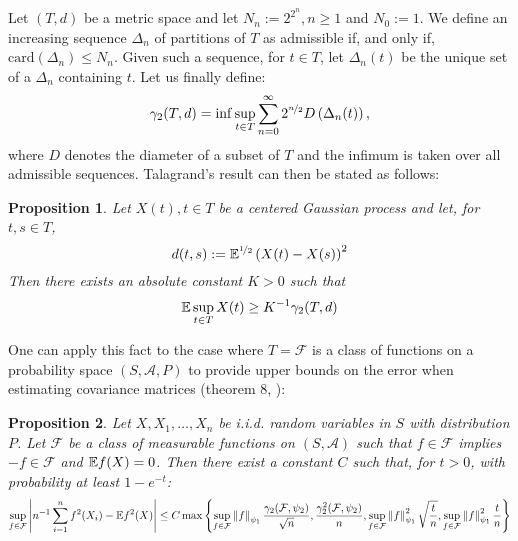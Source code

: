 \documentclass{article}
\numberwithin{equation}{section}
\newtheorem{proposition}{Proposition}
\numberwithin{equation}{section}
\begin{document}
        Let $(T,d)$ be a metric space and let $N_n := 2^{2^n}, n\geq 1$ and $N_0 := 1$. We define an increasing sequence $\Delta_n$ of partitions of $T$ as admissible if, and only if, $\text{card}(\Delta_n) \leq N_n$. Given such a sequence, for $t \in T$, let $\Delta_n(t)$ be the unique set of a $\Delta_n$ containing $t$. Let us finally define:
        \begin{equation}
            \gamma_2(T,d) = \inf \sup_{t\in T} \sum_{n=0}^\infty 2^{\nicefrac{n}{2}} D\left(\Delta_n(t)\right),
        \end{equation}
        where $D$ denotes the diameter of a subset of $T$ and the infimum is taken over all admissible sequences. Talagrand's result can then be stated as follows:
        \begin{proposition}
            \label{th:talagrand}
            Let $X(t), t\in T$ be a centered Gaussian process and let, for $t,s \in T$,
            \begin{equation}
                d(t,s) := \mathbb{E}^{\nicefrac{1}{2}} \left(X(t)-X(s)\right)^2
            \end{equation}
            Then there exists an absolute constant $K>0$ such that
            \[\mathbb{E} \sup_{t\in T} X(t) \geq K^{-1} \gamma_2(T,d)\]
        \end{proposition}

        One can apply this fact to the case where $T = \mathcal{F}$ is a class of functions on a probability space $(S, \mathcal{A}, P)$ to provide upper bounds on the error when estimating covariance matrices (theorem 8, \cite{koltchinskiiConcentrationInequalitiesMoment2014}):
        \begin{proposition}
            Let $X, X_1, \dots, X_n$ be i.i.d. random variables in $S$ with distribution $P$. Let $\mathcal{F}$ be a class of measurable functions on $(S, \mathcal{A})$ such that $f\in \mathcal{F}$ implies $-f\in \mathcal{F}$ and $\mathbb{E} f(X) = 0$. Then there exist a constant $C$ such that, for $t>0$, with probability at least $1-e^{-t}$:
            \begin{equation}
                \label{th:koltchinskii}
                \sup_{f\in \mathcal{F}} \left\vert n^{-1} \sum_{i=1}^n f^2(X_i) - \mathbb{E} f^2(X) \right\vert \leq C \max \left\lbrace \sup_{f\in \mathcal{F}} \left\Vert f \right\Vert_{\psi_{1}}\frac{\gamma_2(\mathcal{F}, \psi_2)}{\sqrt{n}}, \frac{\gamma_2^2(\mathcal{F}, \psi_2)}{n}, \sup_{f\in \mathcal{F}} \left\Vert f \right\Vert_{\psi_{1}}^2\sqrt{\frac{t}{n}}, \sup_{f\in \mathcal{F}} \left\Vert f \right\Vert_{\psi_{1}}^2\frac{t}{n} \right\rbrace
            \end{equation}
        \end{proposition}
\end{document}

